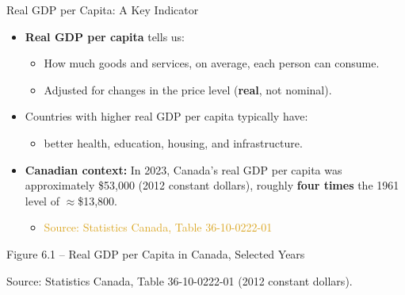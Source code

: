 \documentclass[aspectratio=169]{beamer}
\begin{document}
\begin{frame}{Real GDP per Capita: A Key Indicator}
\transfade
\begin{itemize}[<+->]
  \item \textbf{Real GDP per capita} tells us:
  \begin{itemize}[<+->]
    \item How much goods and services, on average, each person can consume.
    \item Adjusted for changes in the price level (\textbf{real}, not nominal).
  \end{itemize}
  \item Countries with higher real GDP per capita typically have:
  \begin{itemize}[<+->]
    \item better health, education, housing, and infrastructure.
  \end{itemize}
  \item \textbf{Canadian context:} In 2023, Canada's real GDP per capita was approximately \alert{\$53,000} (2012 constant dollars), roughly \textbf{four times} the 1961 level of $\approx$\$13,800.
  \begin{itemize}[<+->]
    \item \textcolor{goldenrod}{Source: Statistics Canada, Table 36-10-0222-01}
  \end{itemize}
\end{itemize}
\end{frame}

\begin{frame}{Figure 6.1 -- Real GDP per Capita in Canada, Selected Years}
\begin{center}
\end{center}
{\tiny Source: Statistics Canada, Table 36-10-0222-01 (2012 constant dollars).}
\end{frame}
\end{document}
